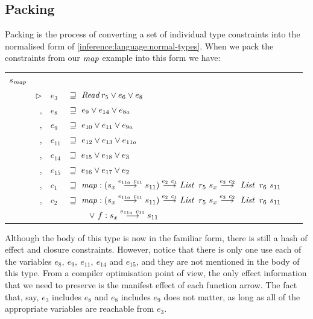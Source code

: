 \subsection{Packing}
Packing is the process of converting a set of individual type constraints into the normalised form of \ref{inference:language:normal-types}. When we pack the constraints from our $\operatorname{\mathit{map}}$ example into this form we have:

\bigskip
\begin{tabular}{llllll}
	$s_{\operatorname{\mathit{map}}}$	
	& \mc{3}{$= (s_x \lfuna{e_{11a} \ c_{11}} s_{11}) 
			\lfuna{e_2 \ c_1} \iList \ r_5 \ s_x 
			\lfuna{e_3 \ c_2} \ \iList \ r_6 \ s_{11}$} 
	\\[1ex]
	& $\rhd$ & $e_3$ 	& $\sqsupseteq \ \operatorname{\mathit{Read}} r_5 \lor e_6 \lor e_8$	\\
	& \ ,	 & $e_8$	& $\sqsupseteq \ e_9 \lor e_{14} \lor e_{8a}$ \\
	& \ ,  	 & $e_9$	& $\sqsupseteq \ e_{10} \lor e_{11} \lor e_{9a}$ \\
	& \ ,	 & $e_{11}$	& $\sqsupseteq \ e_{12} \lor e_{13} \lor e_{11a}$ \\
	& \ ,	 & $e_{14}$	& $\sqsupseteq \ e_{15} \lor e_{18} \lor e_3$ \\
	& \ ,	 & $e_{15}$	& $\sqsupseteq \ e_{16} \lor e_{17} \lor e_{2}$ \\
	& \ , 	 & $c_{1}$	& $\tme \ \imap : (s_x \lfuna{e_{11a} \ c_{11}} s_{11}) 
							\lfuna{e_2 \ c_1} \iList \ r_5 \ s_x 
							\lfuna{e_3 \ c_2} \ \iList \ r_6 \ s_{11}$ \\
	& \ , 	 & $c_{2}$	& $\tme \  \imap : (s_x \lfuna{e_{11a} \ c_{11}} s_{11}) 
							\lfuna{e_2 \ c_1} \iList \ r_5 \ s_x 
							\lfuna{e_3 \ c_2} \ \iList \ r_6 \ s_{11}$ \\
	&	&		& $\ \ \ \ \ \ \ \lor \ f : s_x \lfuna{e_{11a} \ c_{11}} s_{11}$
\end{tabular}

\bigskip
Although the body of this type is now in the familiar form, there is still a hash of effect and closure constraints. However, notice that there is only one use each of the variables $e_8, \ e_9, \ e_{11}, \ e_{14}$ and $e_{15}$, and they are not mentioned in the body of this type. From a compiler optimisation point of view, the only effect information that we need to preserve is the manifest effect of each function arrow. The fact that, say, $e_3$ includes $e_8$ and $e_8$ includes $e_9$ does not matter, as long as all of the appropriate variables are reachable from $e_3$.

